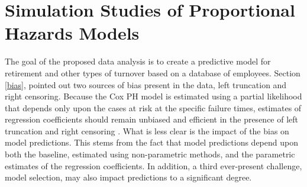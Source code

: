 \documentclass[12pt,letterpaper]{article}
\begin{document}
%

 \section{Simulation Studies of Proportional Hazards Models}

The goal of the proposed data analysis is to create a predictive model for retirement and other types of turnover based on a database of employees. Section \ref{bias}, pointed out two sources of bias present in the data, left truncation and right censoring.  Because the Cox PH model is estimated using a partial likelihood that depends only upon the cases at risk at the specific failure times, estimates of regression coefficients should remain unbiased and efficient in the presence of left truncation and right censoring \citep{Harrell2002}.  What is less clear is the impact of the bias on model predictions. This stems from the fact that model predictions depend upon both the baseline, estimated using non-parametric methods, and the parametric estimates of the regression coefficients.  In addition, a third ever-present challenge, model selection, may also impact predictions to a significant degree.
\end{document}
